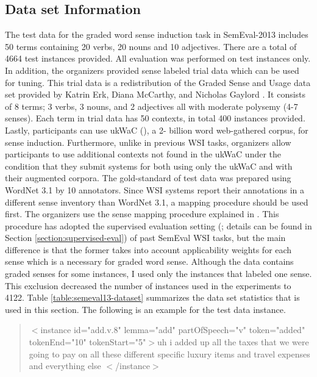 
\subsection{Data set Information} 


The test data for the graded word sense induction task in SemEval-2013 includes 50 terms containing 20 verbs, 20 nouns and 10 adjectives. There are a total of 4664 test instances provided. All evaluation was performed on test instances only. In addition, the organizers provided sense labeled trial data which can be used for tuning. This trial data is a redistribution of the Graded Sense and Usage data set provided by Katrin Erk, Diana McCarthy, and Nicholas Gaylord \cite{erk09graded}. It consists of 8 terms; 3 verbs, 3 nouns, and 2 adjectives all with moderate polysemy (4-7 senses). Each term in trial data has 50 contexts, in total 400 instances provided. Lastly, participants can use ukWaC (\cite{ukWaC}), a 2- billion word web-gathered corpus, for sense induction. Furthermore, unlike in previous WSI tasks, organizers allow participants to use additional contexts not found in the ukWaC under the condition that they submit systems for both using only the ukWaC and with their augmented corpora. The gold-standard of test data was prepared using WordNet 3.1 by 10 annotators. Since WSI systems report their annotations in a different sense inventory than WordNet 3.1, a mapping procedure should be used first. The organizers use the sense mapping procedure explained in \cite{jurgens12evaluation}. This procedure has adopted the supervised evaluation setting  (\cite{agirre06evaluating}; details can be found in Section \ref{section:supervised-eval}) of past SemEval WSI tasks, but the main difference is that the former takes into account applicability weights for each sense which is a necessary for graded word sense. Although the data contains graded senses for some instances, I used only the instances that labeled one sense. This exclusion decreased the number of instances used in the experiments to 4122. Table \ref{table:semeval13-dataset} summarizes the data set statistics that is used in this section. The following is an example for the test data instance.

\begin{quote}
 $<$instance id="add.v.8" 
 lemma="add" partOfSpeech="v" token="added" tokenEnd="10" tokenStart="5"$>$uh i added up all the taxes that we were going to pay on all these different specific luxury items and travel expenses and everything else
 $<$/instance$>$
\end{quote}

